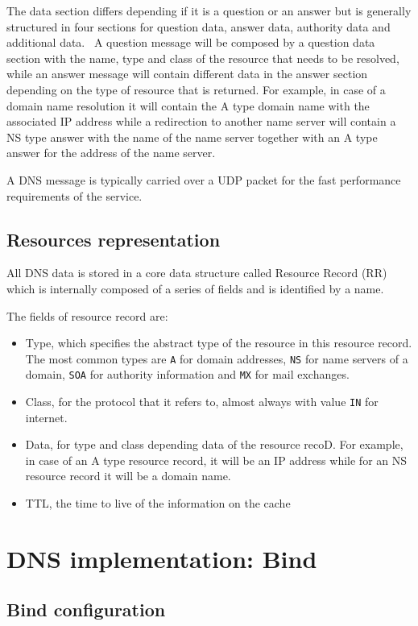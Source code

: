 \documentclass[11pt,a4paper]{article}
\begin{document}
\noindent
The data section differs depending if it is a question or an answer but is generally structured in four sections for question data, answer data, authority data and additional data. 
A question message will be composed by a question data section with the name, type and class of the resource that needs to be resolved, while an answer message will contain different data in the answer section depending on the type of resource that is returned. For example, in case of a domain name resolution it will contain the A type domain name with the associated IP address while a redirection to another name server will contain a NS type answer with the name of the name server together with an A type answer for the address of the name server.

\hfill \break
\noindent
A DNS message is typically carried over a UDP packet for the fast performance requirements of the service.

\subsection{Resources representation}
All DNS data is stored in a core data structure called Resource Record (RR) which is internally composed of a series of fields and is identified by a name.

\hfill \break
\noindent
The fields of resource record are:
\begin{itemize}
\item Type, which specifies the abstract type of the resource in this resource record. The most common types are \texttt{A} for domain addresses, \texttt{NS} for name servers of a domain, \texttt{SOA} for authority information and \texttt{MX} for mail exchanges.
\item Class, for the protocol that it refers to, almost always with value \texttt{IN} for internet.
\item Data, for type and class depending data of the resource recoD. For example, in case of an A type resource record, it will be an IP address while for an NS resource record it will be a domain name.
\item TTL, the time to live of the information on the cache
\end{itemize}

\section{DNS implementation: Bind}

\subsection{Bind configuration}
\end{document}
